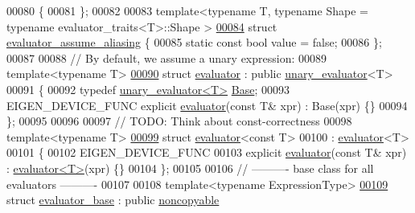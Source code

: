\begin{DoxyCode}
00080 \{
00081 \};
00082 
00083 template<typename T, typename Shape = typename evaluator\_traits<T>::Shape >
\hyperlink{struct_eigen_1_1internal_1_1evaluator__assume__aliasing}{00084} \textcolor{keyword}{struct }\hyperlink{struct_eigen_1_1internal_1_1evaluator__assume__aliasing}{evaluator\_assume\_aliasing} \{
00085   \textcolor{keyword}{static} \textcolor{keyword}{const} \textcolor{keywordtype}{bool} value = \textcolor{keyword}{false};
00086 \};
00087 
00088 \textcolor{comment}{// By default, we assume a unary expression:}
00089 \textcolor{keyword}{template}<\textcolor{keyword}{typename} T>
\hyperlink{struct_eigen_1_1internal_1_1evaluator}{00090} \textcolor{keyword}{struct }\hyperlink{struct_eigen_1_1internal_1_1evaluator}{evaluator} : \textcolor{keyword}{public} \hyperlink{struct_eigen_1_1internal_1_1unary__evaluator}{unary\_evaluator}<T>
00091 \{
00092   \textcolor{keyword}{typedef} \hyperlink{struct_eigen_1_1internal_1_1unary__evaluator}{unary\_evaluator<T>} \hyperlink{struct_eigen_1_1internal_1_1unary__evaluator}{Base};
00093   EIGEN\_DEVICE\_FUNC \textcolor{keyword}{explicit} \hyperlink{struct_eigen_1_1internal_1_1evaluator}{evaluator}(\textcolor{keyword}{const} T& xpr) : Base(xpr) \{\}
00094 \};
00095 
00096 
00097 \textcolor{comment}{// TODO: Think about const-correctness}
00098 \textcolor{keyword}{template}<\textcolor{keyword}{typename} T>
\hyperlink{struct_eigen_1_1internal_1_1evaluator_3_01const_01_t_01_4}{00099} \textcolor{keyword}{struct }\hyperlink{struct_eigen_1_1internal_1_1evaluator}{evaluator}<const T>
00100   : \hyperlink{struct_eigen_1_1internal_1_1evaluator}{evaluator}<T>
00101 \{
00102   EIGEN\_DEVICE\_FUNC
00103   \textcolor{keyword}{explicit} \hyperlink{struct_eigen_1_1internal_1_1evaluator}{evaluator}(\textcolor{keyword}{const} T& xpr) : \hyperlink{struct_eigen_1_1internal_1_1evaluator}{evaluator<T>}(xpr) \{\}
00104 \};
00105 
00106 \textcolor{comment}{// ---------- base class for all evaluators ----------}
00107 
00108 \textcolor{keyword}{template}<\textcolor{keyword}{typename} ExpressionType>
\hyperlink{struct_eigen_1_1internal_1_1evaluator__base}{00109} \textcolor{keyword}{struct }\hyperlink{struct_eigen_1_1internal_1_1evaluator__base}{evaluator\_base} : \textcolor{keyword}{public} \hyperlink{class_eigen_1_1internal_1_1noncopyable}{noncopyable}

\end{DoxyCode}
